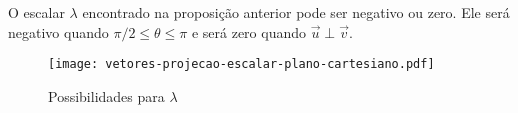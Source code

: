 \begin{observacao}
  O escalar $\lambda$ encontrado na proposi\c{c}\~ao anterior pode ser negativo ou zero. Ele ser\'a negativo quando $\pi/2 \le \theta \le \pi$ e ser\'a zero quando $\vec{u}\perp\vec{v}$.
  \begin{figure}[!h]
    \centering
    \caption{Possibilidades para $\lambda$}
    \texttt{[image: vetores-projecao-escalar-plano-cartesiano.pdf]}


      


  \end{figure}
\end{observacao}

